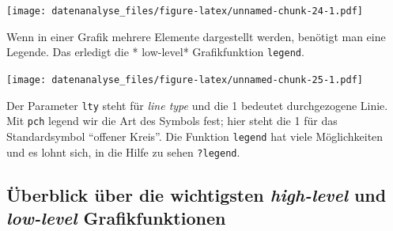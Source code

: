 \documentclass[]{book}
\newenvironment{Shaded}{\begin{snugshade}}{\end{snugshade}}
\newcommand{\CommentTok}[1]{\textcolor[rgb]{0.56,0.35,0.01}{\textit{#1}}}
\newcommand{\DataTypeTok}[1]{\textcolor[rgb]{0.13,0.29,0.53}{#1}}
\newcommand{\DecValTok}[1]{\textcolor[rgb]{0.00,0.00,0.81}{#1}}
\newcommand{\KeywordTok}[1]{\textcolor[rgb]{0.13,0.29,0.53}{\textbf{#1}}}
\newcommand{\NormalTok}[1]{#1}
\newcommand{\OperatorTok}[1]{\textcolor[rgb]{0.81,0.36,0.00}{\textbf{#1}}}
\newcommand{\OtherTok}[1]{\textcolor[rgb]{0.56,0.35,0.01}{#1}}
\newcommand{\StringTok}[1]{\textcolor[rgb]{0.31,0.60,0.02}{#1}}
\begin{document}
\texttt{[image: datenanalyse\_files/figure-latex/unnamed-chunk-24-1.pdf]}

Wenn in einer Grafik mehrere Elemente dargestellt werden, benötigt man eine Legende. Das erledigt die * low-level* Grafikfunktion \texttt{legend}.

\begin{Shaded}
\end{Shaded}

\texttt{[image: datenanalyse\_files/figure-latex/unnamed-chunk-25-1.pdf]}

Der Parameter \texttt{lty} steht für \emph{line type} und die 1 bedeutet durchgezogene Linie. Mit \texttt{pch} legend wir die Art des Symbols fest; hier steht die 1 für das Standardsymbol ``offener Kreis''. Die Funktion \texttt{legend} hat viele Möglichkeiten und es lohnt sich, in die Hilfe zu sehen \texttt{?legend}.

\hypertarget{uxfcberblick-uxfcber-die-wichtigsten-high-level-und-low-level-grafikfunktionen}{%
\subsection{\texorpdfstring{Überblick über die wichtigsten \emph{high-level} und \emph{low-level} Grafikfunktionen}{Überblick über die wichtigsten high-level und low-level Grafikfunktionen}}\label{uxfcberblick-uxfcber-die-wichtigsten-high-level-und-low-level-grafikfunktionen}}
\end{document}
